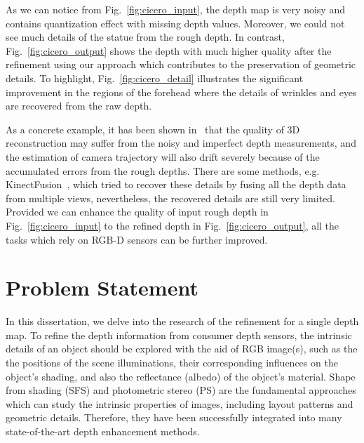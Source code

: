 As we can notice from Fig.~\ref{fig:cicero_input}, the depth map is very noisy and contains quantization effect with missing depth values.
Moreover, we could not see much details of the statue from the rough depth.
In contrast, Fig.~\ref{fig:cicero_output} shows the depth with much higher quality after the refinement using our approach which contributes to the preservation of geometric details.
To highlight, Fig.~\ref{fig:cicero_detail} illustrates the significant improvement in the regions of the forehead where the details of wrinkles and eyes are recovered from the raw depth. 


As a concrete example, it has been shown in~\cite{maier2013thesis} that the quality of 3D reconstruction may suffer from the noisy and imperfect depth measurements, and the estimation of camera trajectory will also drift severely because of the accumulated errors from the rough depths.
There are some methods, e.g. KinectFusion~\cite{newcombe2011kinectfusion}, which tried to recover these details by fusing all the depth data from multiple views, nevertheless, the recovered details are still very limited.
Provided we can enhance the quality of input rough depth in Fig.~\ref{fig:cicero_input} to the refined depth in Fig.~\ref{fig:cicero_output}, all the tasks which rely on RGB-D sensors can be further improved. 

\section{Problem Statement}

In this dissertation, we delve into the research of the refinement for a single depth map.
To refine the depth information from consumer depth sensors, the intrinsic details of an object should be explored with the aid of RGB image(s), such as the the positions of the scene illuminations, their corresponding influences on the object's shading, and also the reflectance (albedo) of the object's material.
Shape from shading (SFS) and photometric stereo (PS) are the fundamental approaches which can study the intrinsic properties of images, including layout patterns and geometric details. 
Therefore, they have been successfully integrated into many state-of-the-art depth enhancement methods.

